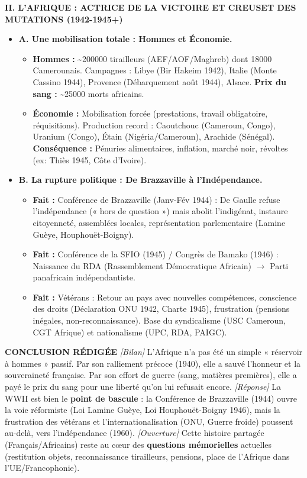 \documentclass[11pt]{article}
\newcommand{\cle}[1]{{\popxbold\color{popdark}#1}}
\begin{document}
\begin{exoresolu}
\textbf{II. L'AFRIQUE : ACTRICE DE LA VICTOIRE ET CREUSET DES MUTATIONS (1942-1945+)}
\begin{itemize}
    \item \textbf{A. Une mobilisation totale : Hommes et Économie.}
    \begin{itemize}
        \item \textbf{Hommes :} \num{~200000} tirailleurs (AEF/AOF/Maghreb) dont \num{18000} Camerounais. Campagnes : Libye (Bir Hakeim 1942), Italie (Monte Cassino 1944), Provence (Débarquement août 1944), Alsace. \textbf{Prix du sang :} \num{~25000} morts africains.
        \item \textbf{Économie :} \cle{Mobilisation forcée} (prestations, travail obligatoire, réquisitions). Production record : Caoutchouc (Cameroun, Congo), Uranium (Congo), Étain (Nigéria/Cameroun), Arachide (Sénégal). \textbf{Conséquence :} Pénuries alimentaires, inflation, marché noir, révoltes (ex: Thiès 1945, Côte d'Ivoire).
    \end{itemize}
    \item \textbf{B. La rupture politique : De Brazzaville à l'Indépendance.}
    \begin{itemize}
        \item \textbf{Fait :} \cle{Conférence de Brazzaville (Janv-Fév 1944)} : De Gaulle refuse l'indépendance (« hors de question ») mais abolit l'indigénat, instaure citoyenneté, assemblées locales, représentation parlementaire (Lamine Guèye, Houphouët-Boigny).
        \item \textbf{Fait :} \cle{Conférence de la SFIO (1945)} / \cle{Congrès de Bamako (1946)} : Naissance du \cle{RDA} (Rassemblement Démocratique Africain) $\rightarrow$ Parti panafricain indépendantiste.
        \item \textbf{Fait :} \cle{Vétérans} : Retour au pays avec nouvelles compétences, conscience des droits (Déclaration ONU 1942, Charte 1945), frustration (pensions inégales, non-reconnaissance). Base du syndicalisme (USC Cameroun, CGT Afrique) et nationalisme (UPC, RDA, PAIGC).
    \end{itemize}
\end{itemize}

\textbf{CONCLUSION RÉDIGÉE}
\textit{[Bilan]} L'Afrique n'a pas été un simple « réservoir à hommes » passif. Par son ralliement précoce (1940), elle a sauvé l'honneur et la souveraineté française. Par son effort de guerre (sang, matières premières), elle a payé le prix du sang pour une liberté qu'on lui refusait encore. \textit{[Réponse]} La WWII est bien le \textbf{point de bascule} : la Conférence de Brazzaville (1944) ouvre la voie réformiste (Loi Lamine Guèye, Loi Houphouët-Boigny 1946), mais la frustration des vétérans et l'internationalisation (ONU, Guerre froide) poussent au-delà, vers l'indépendance (1960). \textit{[Ouverture]} Cette histoire partagée (Français/Africains) reste au cœur des \textbf{questions mémorielles} actuelles (restitution objets, reconnaissance tirailleurs, pensions, place de l'Afrique dans l'UE/Francophonie).

\end{exoresolu}
\end{document}
